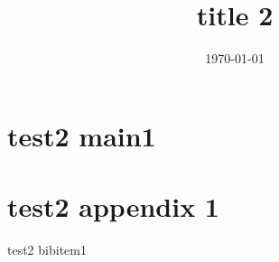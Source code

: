 \documentclass[]{jsarticle}
\title{title 2}
\date{\today}
\begin{document}
\maketitle
\section{test2 main1}
\appendix
\section{test2 appendix 1}
\begin{thebibliography}{1}
     test2 bibitem1
\end{thebibliography}
\end{document}
